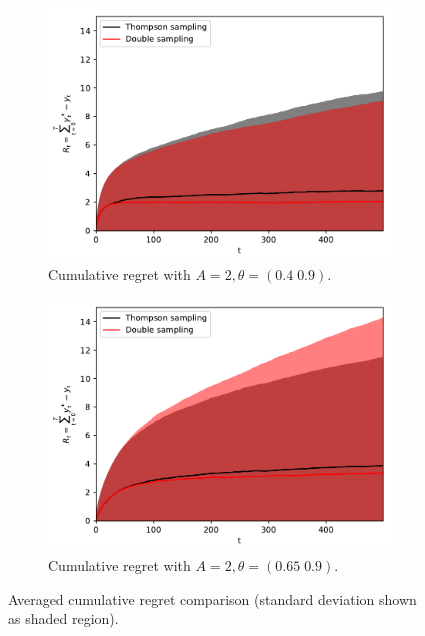 \documentclass{article}
\begin{document}
\begin{figure}[!h]
	\centering
	\begin{subfigure}[b]{0.5\textwidth}
		\includegraphics[width=\textwidth]{./figs/bernoulli/cumulative_regret_great.pdf}
		\caption{Cumulative regret with $A=2, \theta=\left(0.4 \; 0.9\right)$.}
		\label{fig:bernoulli_cumulative_regret_great}
	\end{subfigure}%
	\begin{subfigure}[b]{0.5\textwidth}
		\includegraphics[width=\textwidth]{./figs/bernoulli/cumulative_regret_notgreat.pdf}
		\caption{Cumulative regret with $A=2, \theta=\left(0.65 \; 0.9\right)$.}
		\label{fig:bernoulli_cumulative_regret_notgreat}
	\end{subfigure}
	\caption{Averaged cumulative regret comparison (standard deviation shown as shaded region).}
	\label{fig:bernoulli_cumulative_regret_compare}
\end{figure}
\end{document}
